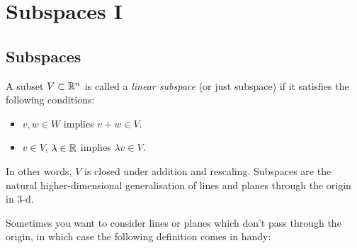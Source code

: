 \documentclass{article}
\begin{document}
\clearpage
\section{Subspaces I}
\subsection{Subspaces}


\begin{Definition}[Subspaces]\label{dfn:subspace}
A subset \(V\subset\mathbb{R}^n\) is called a {\em linear subspace} (or
just subspace) if it satisfies the following conditions:
\begin{itemize}
\item \(v,w\in W\) implies \(v+w\in V\).
\item \(v\in V\), \(\lambda\in\mathbb{R}\) implies \(\lambda v\in V\).
\end{itemize}
In other words, \(V\) is closed under addition and
rescaling. Subspaces are the natural higher-dimensional
generalisation of lines and planes through the origin in 3-d.


\end{Definition}
Sometimes you want to consider lines or planes which don't pass
through the origin, in which case the following definition comes in
handy:
\end{document}
